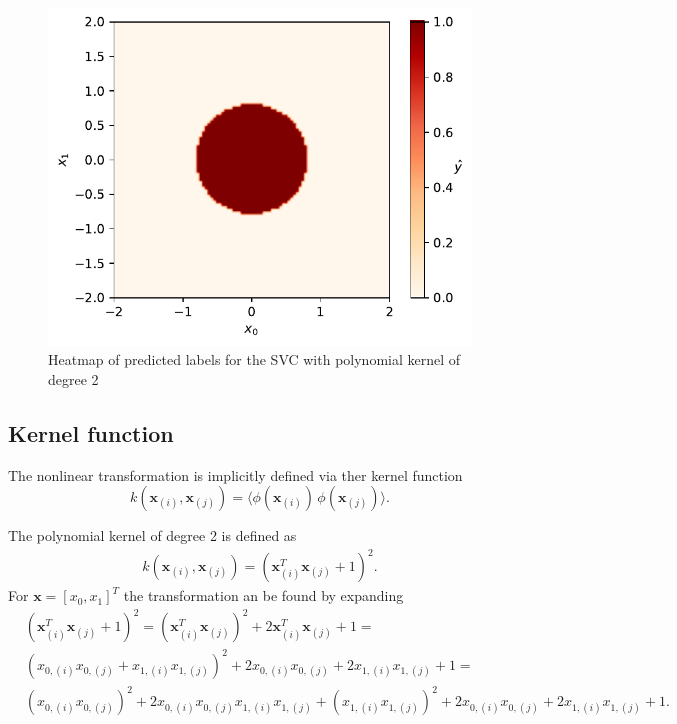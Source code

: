 \documentclass[12pt,a4paper]{scrartcl}
\newcommand{\matr}[1]{\mathbf{#1}}
\begin{document}
	\begin{figure}[H]
		\centering	\includegraphics[width=0.8\linewidth]{figs/ex2_2_circ_heatmap.pdf}
		\caption{Heatmap of predicted labels for the SVC with polynomial kernel of degree 2}
		\label{fig:ex2_2_heatmap}
	\end{figure}
	
	\subsection*{Kernel function}
	The nonlinear transformation is implicitly defined via ther kernel function
	\begin{equation}
		k(\matr{x}_{(i)}, \matr{x}_{(j)}) = \langle \phi \left(\matr{x}_{(i)}\right)\,\phi \left(\matr{x}_{(j)}\right)\rangle.
	\end{equation}
	
	The polynomial kernel of degree 2 is defined as
	\begin{align}
		k(\matr{x}_{(i)}, \matr{x}_{(j)}) = \left(\matr{x}_{(i)}^T \matr{x}_{(j)} +1 \right)^2.
	\end{align}
	For $\matr{x} = \left[x_0, x_1\right]^T$ the transformation an be found by expanding
	\begin{align}
		&\left(\matr{x}_{(i)}^T \matr{x}_{(j)} +1 \right)^2 = \left(\matr{x}_{(i)}^T \matr{x}_{(j)}\right)^2+2\matr{x}_{(i)}^T \matr{x}_{(j)} + 1 = \\& \left(x_{0,(i)} x_{0,(j)} + x_{1,(i)} x_{1,(j)}\right)^2 + 2x_{0,(i)} x_{0,(j)} + 2x_{1,(i)} x_{1,(j)} + 1 = \\
		&\left(x_{0,(i)} x_{0,(j)}\right)^2+2x_{0,(i)} x_{0,(j)}x_{1,(i)} x_{1,(j)} + \left(x_{1,(i)} x_{1,(j)}\right)^2+2x_{0,(i)} x_{0,(j)} + 2x_{1,(i)} x_{1,(j)} + 1.
	\end{align}
	
\end{document}
